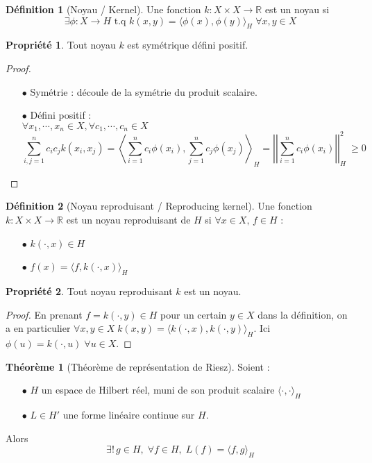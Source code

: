 \documentclass[a4paper, 11pt, french]{article}
\theoremstyle{definition}
\newtheorem{definition}{Définition}
\newtheorem{theorem}{Théorème}
\newtheorem{property}{Propriété}
\begin{document}
	\begin{definition}[Noyau / Kernel]
		Une fonction $k : X \times X \to \mathbb{R}$ est un noyau si
		\[ \exists \phi : X \to H \text{ t.q } k(x,y) = \langle \phi (x), \phi(y) \rangle_H \; \forall x,y \in X \]
	\end{definition}

	\begin{property}
		Tout noyau $k$ est symétrique défini positif.
	\end{property}
	\begin{proof}
		\begin{itemize}
			\item[$\bullet$] Symétrie : découle de la symétrie du produit scalaire.			
			\item[$\bullet$] Défini positif : \\
			$\forall x_1, \cdots, x_n \in X, \forall c_1, \cdots, c_n \in X$
			\[\sum_{i,j=1}^{n} c_i c_j k(x_i, x_j) = \left\langle \sum_{i=1}^{n} c_i \phi(x_i), \sum_{j=1}^{n} c_j \phi(x_j) \right\rangle_H = \left|\left|\sum_{i=1}^{n} c_i \phi(x_i)\right|\right|_H^2\ \geq 0\]
		\end{itemize}
	\end{proof}

	\begin{definition}[Noyau reproduisant / Reproducing kernel]
		Une fonction $k : X \times X \to \mathbb{R}$ est un noyau reproduisant de $H$ si $\forall x \in X, \, f \in H$ :
		\begin{itemize}
			\item[$\bullet$] $k(\cdot, x) \in H$			
			\item[$\bullet$] $f(x) = \langle f, k(\cdot, x) \rangle_H$
		\end{itemize}
	\end{definition}

	\newpage

	\begin{property}
	\label{prop:reprotokernel}
		Tout noyau reproduisant $k$ est un noyau.
	\end{property}
	\begin{proof}
		En prenant $f = k(\cdot, y) \in H$ pour un certain $y \in X$ dans la définition, on a en particulier $\forall x, y \in X \; k(x,y) = \langle k(\cdot, x), k(\cdot, y) \rangle_H$. Ici $\phi(u) = k(\cdot, u) \; \forall u \in X$.
	\end{proof}

	\begin{theorem}[Théorème de représentation de Riesz]
		Soient :
		\begin{itemize}
			\item[$\bullet$] $H$ un espace de Hilbert réel, muni de son produit scalaire $\langle \cdot, \cdot \rangle_H$
			\item[$\bullet$] $L \in H'$ une forme linéaire continue sur $H$.
		\end{itemize}
		Alors \[\exists ! \, g \in H, \; \forall f \in H, \; L(f) = \langle f, g \rangle_H\]
	\end{theorem}
\end{document}
